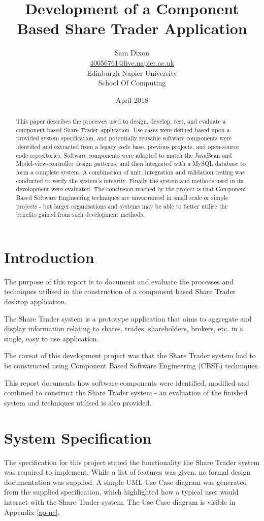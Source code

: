\documentclass[12pt, a4paper,titlepage]{article}
\title{Development of a Component Based Share Trader Application}
\author{Sam Dixon
        \\\href{mailto:40056761@live.napier.ac.uk}{40056761@live.napier.ac.uk}
        \\Edinburgh Napier University
        \\School Of Computing
        \\}
\date{April 2018}
\begin{document}
\maketitle


\begin{abstract}
\thispagestyle{plain}
This paper describes the processes used to design, develop, test, and evaluate
a component based Share Trader application.
Use cases were defined based upon a provided system specification, and
potentially reusable software components were identified and extracted from a
legacy code base, previous projects, and open-source code repositories.
Software components were adapted to match the JavaBean and
Model-view-controller design patterns, and then integrated with a MySQL
database to form a complete system.
A combination of unit, integration and validation testing was conducted to
verify the system's integrity.
Finally the system and methods used in its development were evaluated.
The conclusion reached by the project is that Component Based Software
Engineering techniques are unwarranted in small scale or simple projects - but
larger organisations and systems may be able to better utilise the benefits
gained from such development methods.
\end{abstract}


\setcounter{page}{2}
\tableofcontents
\newpage
{}


\section{Introduction}
The purpose of this report is to document and evaluate the processes and
techniques utilised in the construction of a component based Share Trader
desktop application.

The Share Trader system is a prototype application that aims to aggregate and
display information relating to shares, trades, shareholders, brokers, etc. in
a single, easy to use application. 

The caveat of this development project was that the Share Trader system had to
be constructed using Component Based Software Engineering (CBSE) techniques.

This report documents how software components were identified, modified and
combined to construct the Share Trader system - an evaluation of the finished
system and techniques utilised is also provided.


\section{System Specification}
The specification for this project stated the functionality the Share Trader
system was required to implement.
While a list of features was given, no formal design documentation was
supplied.
A simple UML Use Case diagram was generated from the supplied specification,
which highlighted how a typical user would interact with the Share Trader
system.
The Use Case diagram is visible in Appendix \ref{ap-uc}.
\end{document}
